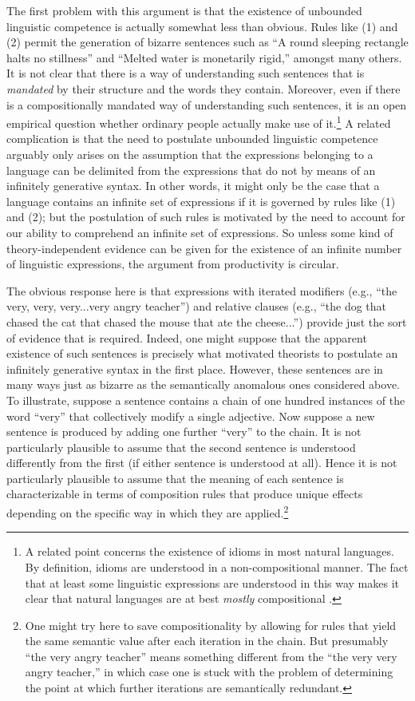 The first problem with this argument is that the existence of unbounded linguistic competence is actually somewhat less than obvious. Rules like (1) and (2) permit the generation of bizarre sentences such as ``A round sleeping rectangle halts no stillness'' and ``Melted water is monetarily rigid,'' amongst many others. It is not clear that there is a way of understanding such sentences that is \textit{mandated} by their structure and the words they contain. Moreover, even if there is a compositionally mandated way of understanding such sentences, it is an open empirical question whether ordinary people actually make use of it.\footnote{A related point concerns the existence of idioms in most natural languages. By definition, idioms are understood in a non-compositional manner. The fact that at least some linguistic expressions are understood in this way makes it clear that natural languages are at best \textit{mostly} compositional \citep{FodorPylyshyn:1988,Szabo:2012}.} A related complication is that the need to postulate unbounded linguistic competence arguably only arises on the assumption that the expressions belonging to a language can be delimited from the expressions that do not by means of an infinitely generative syntax. In other words, it might only be the case that a language contains an infinite set of expressions if it is governed by rules like (1) and (2); but the postulation of such rules is motivated by the need to account for our ability to comprehend an infinite set of expressions. So unless some kind of theory-independent evidence can be given for the existence of an infinite number of linguistic expressions, the argument from productivity is circular.

The obvious response here is that expressions with iterated modifiers (e.g., ``the very, very, very...very angry teacher'') and relative clauses (e.g., ``the dog that chased the cat that chased the mouse that ate the cheese...'') provide just the sort of evidence that is required. Indeed, one might suppose that the apparent existence of such sentences is precisely what motivated theorists to postulate an infinitely generative syntax in the first place. However, these sentences are in many ways just as bizarre as the semantically anomalous ones considered above. To illustrate, suppose a sentence contains a chain of one hundred instances of the word ``very'' that collectively modify a single adjective. Now suppose a new sentence is produced by adding one further ``very'' to the chain. It is not particularly plausible to assume that the second sentence is understood differently from the first (if either sentence is understood at all). Hence it is not particularly plausible to assume that the meaning of each sentence is characterizable in terms of composition rules that produce unique effects depending on the specific way in which they are applied.\footnote{One might try here to save compositionality by allowing for rules that yield the same semantic value after each iteration in the chain. But presumably ``the very angry teacher'' means something different from the ``the very very angry teacher,'' in which case one is stuck with the problem of determining the point at which further iterations are semantically redundant.} 

